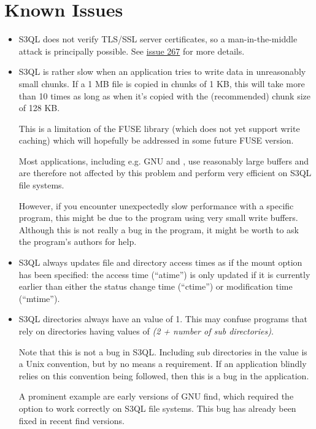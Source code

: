\documentclass[letterpaper,10pt,english]{sphinxmanual}
\begin{document}
\chapter{Known Issues}
\label{issues:known-issues}\label{issues::doc}\begin{itemize}
\item {} 
S3QL does not verify TLS/SSL server certificates, so a
man-in-the-middle attack is principally possible. See \href{http://code.google.com/p/s3ql/issues/detail?id=267}{issue 267} for more
details.

\item {} 
S3QL is rather slow when an application tries to write data in
unreasonably small chunks. If a 1 MB file is copied in chunks of 1
KB, this will take more than 10 times as long as when it's copied
with the (recommended) chunk size of 128 KB.

This is a limitation of the FUSE library (which does not yet support
write caching) which will hopefully be addressed in some future FUSE
version.

Most applications, including e.g. GNU  and , use
reasonably large buffers and are therefore not affected by this
problem and perform very efficient on S3QL file systems.

However, if you encounter unexpectedly slow performance with a
specific program, this might be due to the program using very small
write buffers. Although this is not really a bug in the program,
it might be worth to ask the program's authors for help.

\item {} 
S3QL always updates file and directory access times as if the 
mount option has been specified: the access time (``atime'') is only updated
if it is currently earlier than either the status change time
(``ctime'') or modification time (``mtime'').

\item {} 
S3QL directories always have an  value of 1. This may confuse
programs that rely on directories having  values of \emph{(2 +
number of sub directories)}.

Note that this is not a bug in S3QL. Including sub directories in
the  value is a Unix convention, but by no means a
requirement. If an application blindly relies on this convention
being followed, then this is a bug in the application.

A prominent example are early versions of GNU find, which required
the  option to work correctly on S3QL file systems. This
bug has already been fixed in recent find versions.


\end{itemize}
\end{document}
